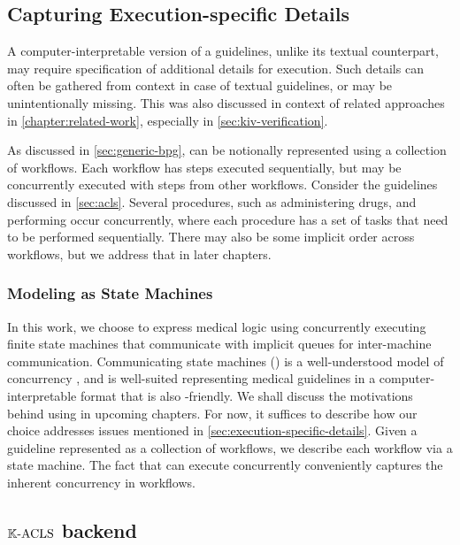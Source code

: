 \subsection{Capturing Execution-specific Details}\label{sec:execution-specific-details}

A computer-interpretable version of a guidelines, unlike its
textual counterpart, may require specification of additional details
for execution. Such details can often be gathered from context in case
of textual guidelines, or may be unintentionally missing. This was also
discussed in context of related approaches in \autoref{chapter:related-work},
especially in \autoref{sec:kiv-verification}.

As discussed in \autoref{sec:generic-bpg}, \BPGs{} can be notionally
represented using a collection of workflows. Each workflow has steps
executed sequentially, but may be concurrently executed with steps from
other workflows. Consider the \ACLS{} guidelines discussed in
\autoref{sec:acls}. Several procedures, such as administering drugs,
and performing \CPR{} occur concurrently, where each procedure has
a set of tasks that need to be performed sequentially.
There may also be some implicit order across workflows, but we
address that in later chapters.

\subsubsection{Modeling \BPGs{} as State Machines}

In this work, we choose to express medical logic using
concurrently executing finite state machines that communicate
with implicit queues for inter-machine communication. Communicating
state machines (\CSMs{}) is a well-understood model of concurrency
\cite{BrandJACM83}, and is well-suited  representing medical guidelines in a
computer-interpretable format that is also \HCP{}-friendly.
We shall discuss the motivations behind using \CSMs{} in upcoming
chapters. For now, it suffices to describe how our choice addresses
issues mentioned in \autoref{sec:execution-specific-details}.
Given a guideline represented as a collection of workflows, we
describe each workflow via a state machine. The fact that
\CSMs{} can execute concurrently conveniently captures the
inherent concurrency in workflows.


\subsection{$\mathbb{K}{}\text{-ACLS}$ backend}\label{sec:kacls-backend}




